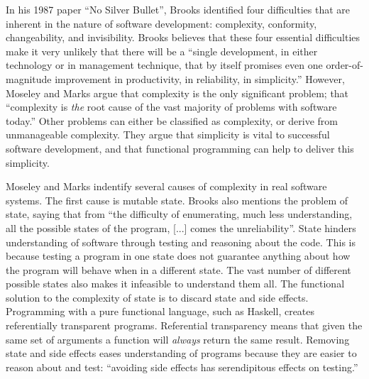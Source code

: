 In his 1987 paper ``No Silver Bullet'', Brooks identified four difficulties that
are inherent in the nature of software development: complexity, conformity,
changeability, and invisibility.\cite{brooks1987bullet} Brooks believes that
these four essential difficulties make it very unlikely that there will be a
``single development, in either technology or in management technique,
that by itself promises even one order-of-magnitude improvement in productivity,
in reliability, in simplicity.'' However, Moseley and Marks argue that complexity
is the only significant problem; that ``complexity is \emph{the} root cause of the
vast majority of problems with software today.''\cite{moseley2006tarpit} Other
problems can either be classified as complexity, or derive from unmanageable
complexity. They argue that simplicity is vital to successful software development,
and that functional programming can help to deliver this simplicity.

Moseley and Marks indentify several causes of complexity in real software systems.
The first cause is mutable state. Brooks also mentions the problem of state,
saying that from ``the difficulty of enumerating, much less understanding, all
the possible states of the program, [...] comes the unreliability''.\cite{brooks1987bullet}
State hinders understanding of software through testing and reasoning about the code.
This is because testing a program in one state does not guarantee anything about
how the program will behave when in a different state. The vast number of different
possible states also makes it infeasible to understand them all. The functional
solution to the complexity of state is to discard state and side effects.
Programming with a pure functional language, such as Haskell, creates referentially
transparent programs. Referential transparency means that given the same set of
arguments a function will \emph{always} return the same result. Removing state
and side effects eases understanding of programs because they are easier to
reason about and test: ``avoiding side effects has serendipitous effects on testing.''\cite{smallbone2011}

